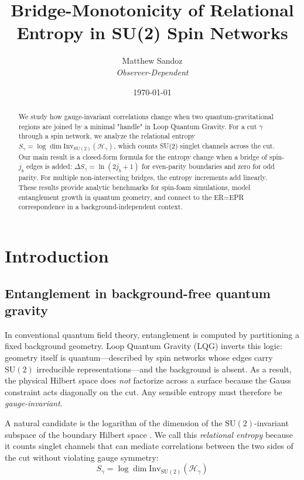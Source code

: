 \documentclass[11pt, a4paper]{article}
\title{Bridge-Monotonicity of Relational Entropy in SU(2) Spin Networks}
\author{Matthew Sandoz\\ \textit{Observer-Dependent}}
\date{\today}
\theoremstyle{plain}
\theoremstyle{definition}
\theoremstyle{remark}
\newcommand{\Hil}{\mathcal{H}}
\newcommand{\Inv}{\mathrm{Inv}}
\newcommand{\SU}{\mathrm{SU}}
\begin{document}
\begin{abstract}
We study how gauge-invariant correlations change when two quantum-gravitational regions are joined by a minimal "handle" in Loop Quantum Gravity. For a cut $\gamma$ through a spin network, we analyze the relational entropy $S_{\gamma} = \log\dim\Inv_{\SU(2)}(\Hil_{\gamma})$, which counts SU(2) singlet channels across the cut. Our main result is a closed-form formula for the entropy change when a bridge of spin-$j_b$ edges is added: $\Delta S_{\gamma} = \ln(2j_b+1)$ for even-parity boundaries and zero for odd parity. For multiple non-intersecting bridges, the entropy increments add linearly. These results provide analytic benchmarks for spin-foam simulations, model entanglement growth in quantum geometry, and connect to the ER=EPR correspondence in a background-independent context.
\end{abstract}

\maketitle

\section{Introduction}
\label{sec:intro}

\subsection{Entanglement in background-free quantum gravity}

In conventional quantum field theory, entanglement is computed by partitioning a fixed background geometry. Loop Quantum Gravity (LQG) inverts this logic: geometry itself is quantum—described by spin networks whose edges carry $\SU(2)$ irreducible representations—and the background is absent. As a result, the physical Hilbert space does \emph{not} factorize across a surface because the Gauss constraint acts diagonally on the cut. Any sensible entropy must therefore be \emph{gauge-invariant}.

A natural candidate is the logarithm of the dimension of the $\SU(2)$-invariant subspace of the boundary Hilbert space \cite{DonnellyFreidel2016,DonnellyWall2016}. We call this \emph{relational entropy} because it counts singlet channels that can mediate correlations between the two sides of the cut without violating gauge symmetry:
\begin{equation}
S_{\gamma} = \log\dim\Inv_{\SU(2)}(\Hil_{\gamma})
\end{equation}
\end{document}
